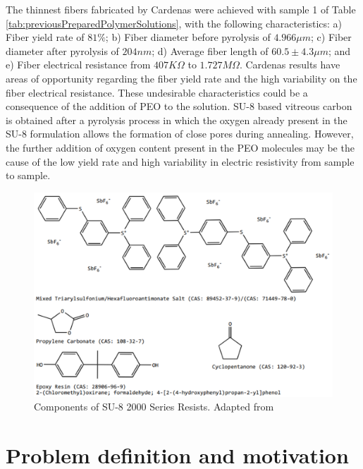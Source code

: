 The thinnest fibers fabricated by Cardenas \cite{Cardenas2017} were achieved with sample 1 of Table \ref{tab:previousPreparedPolymerSolutions}, with the following characteristics: a) Fiber yield rate of $81\%$; b) Fiber diameter before pyrolysis of $4.966 \mu m$; c) Fiber diameter after pyrolysis of $204 nm$; d) Average fiber length of $60.5 ± 4.3 \mu m$; and e) Fiber electrical resistance from $407 K \Omega$ to $1.727 M \Omega$. Cardenas results have areas of opportunity regarding the fiber yield rate and the high variability on the fiber electrical resistance. These undesirable characteristics could be a consequence of the addition of PEO to the solution. SU-8 based vitreous carbon is obtained after a pyrolysis process in which the oxygen already present in the SU-8 formulation allows the formation of close pores during annealing. However, the further addition of oxygen content present in the PEO molecules may be the cause of the low yield rate and high variability in electric resistivity from sample to sample.

\begin{figure}[!th]
\centering
\includegraphics[scale=0.50]{./Figures/su8Components.png}
\decoRule
\caption[Components of SU-8 2000 Series Resists]{Components of SU-8 2000 Series Resists. Adapted from \cite{Microchem2012}}
\label{fig:su8Components}
\end{figure}

\section{Problem definition and motivation}

